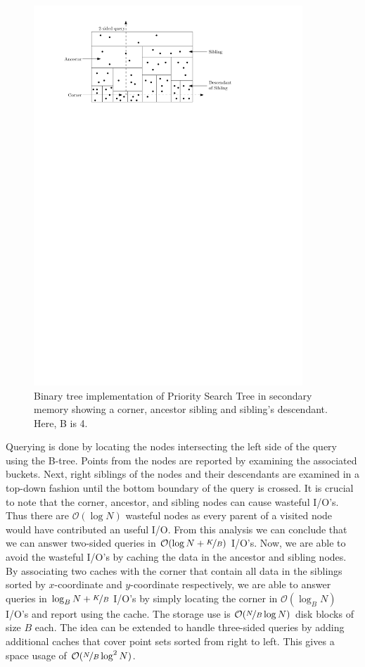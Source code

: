 \documentclass[twoside,11pt,openright]{report}
\begin{document}
\begin{figure}[h]
	\centering
		\includegraphics[width=0.9\textwidth]{../figures/ramaswamy_query}
	\caption{Binary tree implementation of Priority Search Tree in secondary memory showing a corner, ancestor sibling and sibling's descendant. Here, B is 4.}
	\label{fig:ramaswamy_query}
\end{figure}

Querying is done by locating the nodes intersecting the left side of the query using the B-tree. Points from the nodes are reported by examining the associated buckets. Next, right siblings of the nodes and their descendants are examined in a top-down fashion until the bottom boundary of the query is crossed. It is crucial to note that the corner, ancestor, and sibling nodes can cause wasteful I/O's. Thus there are $\mathcal{O}(\log N)$ wasteful nodes as every parent of a visited node would have contributed an useful I/O. From this analysis we can conclude that we can answer two-sided queries in $\mathcal{O}(\log N + \nicefrac{K}{B})$ I/O's. Now, we are able to avoid the wasteful I/O's by caching the data in the ancestor and sibling nodes. By associating two caches with the corner that contain all data in the siblings sorted by $x$-coordinate and $y$-coordinate respectively, we are able to answer queries in $\log_B N + \nicefrac{K}{B}$ I/O's by simply locating the corner in $\mathcal{O}(\log_B N)$ I/O's and report using the cache. The storage use is $\mathcal{O}(\nicefrac{N}{B} \log N)$ disk blocks of size $B$ each. The idea can be extended to handle three-sided queries by adding additional caches that cover point sets sorted from right to left. This gives a space usage of $\mathcal{O}(\nicefrac{N}{B} \log^2 N)$. 
\end{document}
